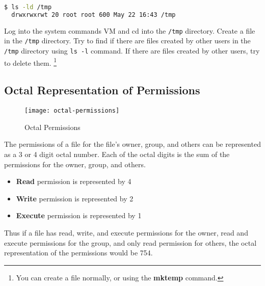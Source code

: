 \begin{lstlisting}[language=bash]
  $ ls -ld /tmp
  drwxrwxrwt 20 root root 600 May 22 16:43 /tmp
\end{lstlisting}

\begin{exercise}
  Log into the system commands VM and cd into the \lstinline|/tmp| directory.
  Create a file in the \lstinline|/tmp| directory.
  Try to find if there are files created by other users in the \lstinline|/tmp| directory using \lstinline|ls -l| command.
  If there are files created by other users, try to delete them.
  \footnote{
    You can create a file normally, or using the \textbf{mktemp} command.
  }
\end{exercise}

\subsection{Octal Representation of Permissions}

\begin{figure}
  \texttt{[image: octal-permissions]}
  \caption[Octal Permissions]{Octal Permissions}
\end{figure}

The permissions of a file for the file's owner, group, and others can be represented as a 3 or 4 digit octal number.
Each of the octal digits is the sum of the permissions for the owner, group, and others.

\begin{itemize}
  \item \textbf{Read} permission is represented by 4
  \item \textbf{Write} permission is represented by 2
  \item \textbf{Execute} permission is represented by 1
\end{itemize}

Thus if a file has read, write, and execute permissions for the owner, read and execute permissions for the group, and only read permission for others, the octal representation of the permissions would be 754.


